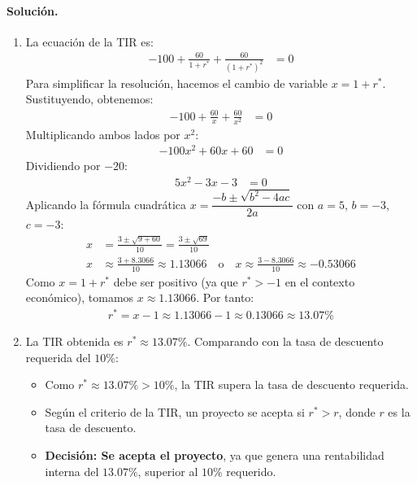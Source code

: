 \documentclass[12pt,a4paper]{article}
\newenvironment{solucion}{\paragraph{Solución.}}{}
\begin{document}
\begin{solucion}
\begin{enumerate}[label=\alph*)]
  \item La ecuación de la TIR es:
  \begin{align*}
  -100+\frac{60}{1+r^*}+\frac{60}{(1+r^*)^2}&=0
  \end{align*}
  Para simplificar la resolución, hacemos el cambio de variable $x=1+r^*$. Sustituyendo, obtenemos:
  \begin{align*}
  -100+\frac{60}{x}+\frac{60}{x^2}&=0
  \end{align*}
  Multiplicando ambos lados por $x^2$:
  \begin{align*}
  -100x^2+60x+60&=0
  \end{align*}
  Dividiendo por $-20$:
  \begin{align*}
  5x^2-3x-3&=0
  \end{align*}
  Aplicando la fórmula cuadrática $x=\dfrac{-b\pm\sqrt{b^2-4ac}}{2a}$ con $a=5$, $b=-3$, $c=-3$:
  \begin{align*}
  x&=\frac{3\pm\sqrt{9+60}}{10}=\frac{3\pm\sqrt{69}}{10}\\
  x&\approx\frac{3+8.3066}{10}\approx1.13066\quad\text{o}\quad x\approx\frac{3-8.3066}{10}\approx-0.53066
  \end{align*}
  Como $x=1+r^*$ debe ser positivo (ya que $r^*>-1$ en el contexto económico), tomamos $x\approx1.13066$. Por tanto:
  \begin{align*}
  r^*=x-1\approx1.13066-1\approx0.13066\approx13.07\%
  \end{align*}
  
  \item La TIR obtenida es $r^*\approx13.07\%$. Comparando con la tasa de descuento requerida del $10\%$:
  \begin{itemize}
    \item Como $r^*\approx13.07\%>10\%$, la TIR supera la tasa de descuento requerida.
    \item Según el criterio de la TIR, un proyecto se acepta si $r^*>r$, donde $r$ es la tasa de descuento.
    \item \textbf{Decisión: Se acepta el proyecto}, ya que genera una rentabilidad interna del $13.07\%$, superior al $10\%$ requerido.
  \end{itemize}
\end{enumerate}
\end{solucion}
\end{document}
